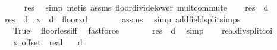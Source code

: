 \begin{isabellebody}
\ \ \isamarkupfalse%
\ {\isachardoublequoteopen}{}\ {\isasymle}\ {\isacharquery}{\kern0pt}res{\isachardoublequoteclose}\ \isamarkupfalse%
\ simp\ {\isacharparenleft}{\kern0pt}metis\ assms\ floor{\isacharunderscore}{\kern0pt}divide{\isacharunderscore}{\kern0pt}lower\ mult{\isachardot}{\kern0pt}commute{\isacharparenright}{\kern0pt}\isanewline
\ \ \isamarkupfalse%
\ {\isachardoublequoteopen}{\isacharquery}{\kern0pt}res\ {\isacharless}{\kern0pt}\ d{\isachardoublequoteclose}\isanewline
\ \ \isamarkupfalse%
{\isacharminus}{\kern0pt}\isanewline
\ \ \ \ \isamarkupfalse%
\ {\isachardoublequoteopen}{\isacharquery}{\kern0pt}res\ {\isacharless}{\kern0pt}\ d\ {\isasymlongleftrightarrow}\ {\isacharparenleft}{\kern0pt}x\ {\isacharslash}{\kern0pt}\ d{\isacharparenright}{\kern0pt}\ {\isacharless}{\kern0pt}\ {\isacharparenleft}{\kern0pt}{}{\isacharplus}{\kern0pt}floor{\isacharparenleft}{\kern0pt}x{\isacharslash}{\kern0pt}d{\isacharparenright}{\kern0pt}{\isacharparenright}{\kern0pt}{\isachardoublequoteclose}\isanewline
\ \ \ \ \ \ \isamarkupfalse%
\ assms\ \isamarkupfalse%
\ {\isacharparenleft}{\kern0pt}simp\ add{\isacharcolon}{\kern0pt}field{\isacharunderscore}{\kern0pt}split{\isacharunderscore}{\kern0pt}simps{\isacharparenright}{\kern0pt}\isanewline
\ \ \ \ \isamarkupfalse%
\ \isamarkupfalse%
\ {\isachardoublequoteopen}{\isasymdots}\ {\isasymlongleftrightarrow}\ True{\isachardoublequoteclose}\ \isamarkupfalse%
\ floor{\isacharunderscore}{\kern0pt}less{\isacharunderscore}{\kern0pt}iff\ \isamarkupfalse%
\ fastforce\isanewline
\ \ \ \ \isamarkupfalse%
\ \isamarkupfalse%
\ {\isachardoublequoteopen}{\isacharquery}{\kern0pt}res\ {\isacharless}{\kern0pt}\ d{\isachardoublequoteclose}\ \isamarkupfalse%
\ simp\isanewline
\ \ \isamarkupfalse%
\isanewline
{}\isamarkupfalse%
%
\endisatagproof
{\isafoldproof}%
%
\isadelimproof
\isanewline
%
\endisadelimproof
\isanewline
{}\isamarkupfalse%
\ real{\isacharunderscore}{\kern0pt}div{\isacharunderscore}{\kern0pt}split{\isacharunderscore}{\kern0pt}coi{\isacharcolon}{\kern0pt}\isanewline
\ \ \ x\ offset\ {\isacharcolon}{\kern0pt}{\isacharcolon}{\kern0pt}\ real\isanewline
\ \ \ {\isachardoublequoteopen}d\ {\isachargreater}{\kern0pt}\ {}{\isachardoublequoteclose}\isanewline

\end{isabellebody}
